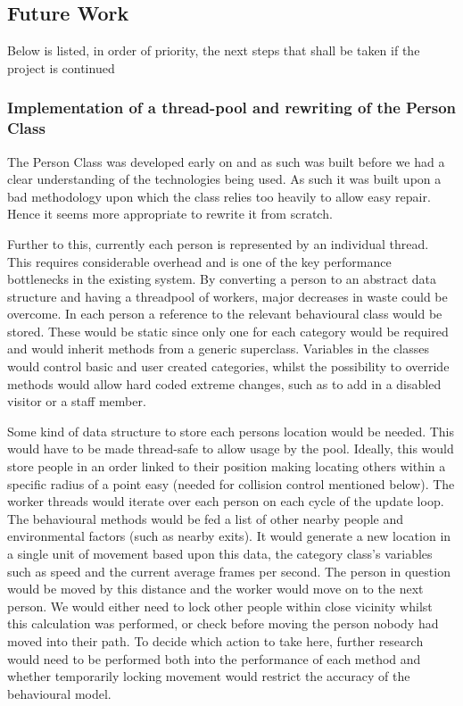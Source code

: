 \subsection{Future Work}

Below is listed, in order of priority, the next steps that shall be taken
if the project is continued


\subsubsection{Implementation of a thread-pool and rewriting of the Person Class}
\label{threadingSolution}

The Person Class was developed early on and as such was built before
we had a clear understanding of the technologies being used. As such
it was built upon a bad methodology upon which the class relies too
heavily to allow easy repair. Hence it seems more appropriate to rewrite
it from scratch.

Further to this, currently each person is represented by an individual
thread. This requires considerable overhead and is one of the key
performance bottlenecks in the existing system. By converting a person
to an abstract data structure and having a threadpool of workers, major
decreases in waste could be overcome. In each person a reference to the 
relevant behavioural class would be stored. These would be static
since only one for each category would be required and would inherit
methods from a generic superclass. Variables in the classes would
control basic and user created categories, whilst the possibility
to override methods would allow hard coded extreme changes, such as
to add in a disabled visitor or a staff member.

Some kind of data structure to store each persons location would be needed.
This would have to be made thread-safe to allow usage by the pool.
Ideally, this would store people in an order linked to their position
making locating others within a specific radius of a point easy (needed
for collision control mentioned below). The worker threads would iterate
over each person on each cycle of the update loop. The behavioural
methods would be fed a list of other nearby people and environmental
factors (such as nearby exits). It would generate a new location in
a single unit of movement based upon this data, the category class's
variables such as speed and the current average frames per second.
The person in question would be moved by this distance and the worker
would move on to the next person. We would either need to lock other
people within close vicinity whilst this calculation was performed,
or check before moving the person nobody had moved into their path.
To decide which action to take here, further research would need to
be performed both into the performance of each method and whether
temporarily locking movement would restrict the accuracy of the behavioural
model.


